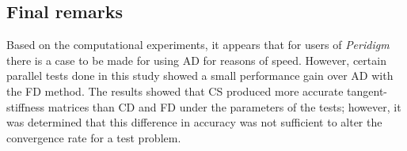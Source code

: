 \documentclass[preprint,12pt]{elsarticle}
\begin{document}
\subsection{Final remarks}
%
Based on the computational experiments, it appears that for users of \emph{Peridigm} there is a case to be made for using AD for reasons of speed. However, certain parallel tests done in this study showed a small performance gain over AD with the FD method.  The results showed that CS produced more accurate tangent-stiffness matrices than CD and FD under the parameters of the tests; however, it was determined that this difference in accuracy was not sufficient to alter the convergence rate for a test problem.  
\end{document}
